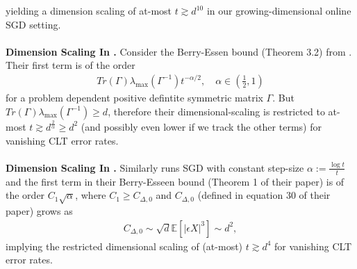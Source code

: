 \documentclass[11pt, reqno,english]{amsart}
\begin{document}
yielding a dimension scaling of at-most $t \gtrsim d^{10}$ in our growing-dimensional online SGD setting.
\\\\
\textbf{Dimension Scaling In \cite{WuLiWeiRinaldo2025InferenceTD}.} Consider the Berry-Essen bound (Theorem 3.2) from \cite{WuLiWeiRinaldo2025InferenceTD}. Their first term is of the order 
\begin{align*}
Tr(\Gamma)\lambda_{\max}(\Gamma^{-1})t^{-\alpha/2}, \quad \alpha \in (\frac{1}{2}, 1 )    
\end{align*}
for a problem dependent positive defintite symmetric matrix $\Gamma$. But $Tr(\Gamma)\lambda_{\max}(\Gamma^{-1}) \geq d$, therefore their dimensional-scaling is restricted to at-most $t \gtrsim d^{\frac{2}{\alpha}} \geq d^2$ (and possibly even lower if we track the other terms) for vanishing CLT error rates.
\\\\
\textbf{Dimension Scaling In \cite{Khusainov2025GaussianApprox}.} Similarly \cite{Khusainov2025GaussianApprox} runs SGD with constant step-size $\alpha := \frac{\log t}{t}$ and the first term in their Berry-Esseen bound (Theorem 1 of their paper) is of the order $C_1 \sqrt{\alpha}$, where $C_1 \geq C_{\Delta, 0}$ and $C_{\Delta, 0}$ (defined in equation 30 of their paper) grows as
\begin{align*}
    C_{\Delta, 0} \sim \sqrt{d}\mathbb{E}[|\epsilon X|^{3}] \sim d^2,
\end{align*}
implying the restricted dimensional scaling of (at-most) $t \gtrsim d^4$ for vanishing CLT error rates.
\end{document}
